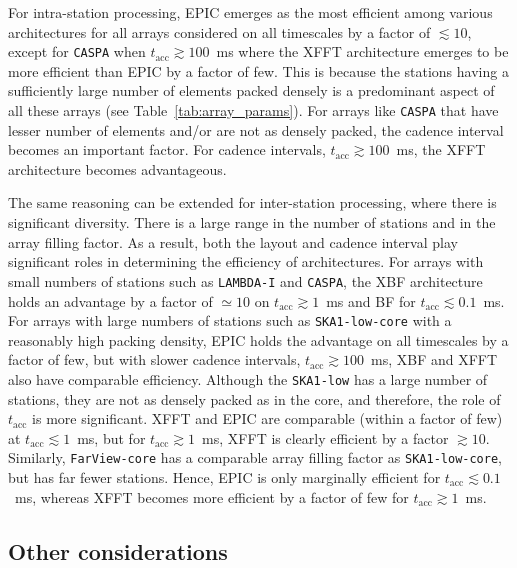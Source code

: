\documentclass[
  journal=pasa,
  manuscript=article-type,
  year=2020,
  volume=37,
]{cup-journal}
\begin{document}
For intra-station processing, EPIC emerges as the most efficient among various architectures for all arrays considered on all timescales by a factor of $\lesssim 10$, except for \texttt{CASPA} when $t_\textrm{acc}\gtrsim 100$~ms where the XFFT architecture emerges to be more efficient than EPIC by a factor of few. This is because the stations having a sufficiently large number of elements packed densely is a predominant aspect of all these arrays (see Table~\ref{tab:array_params}). For arrays like \texttt{CASPA} that have lesser number of elements and/or are not as densely packed, the cadence interval becomes an important factor. For cadence intervals, $t_\textrm{acc}\gtrsim 100$~ms, the XFFT architecture becomes advantageous.

The same reasoning can be extended for inter-station processing, where there is significant diversity. There is a large range in the number of stations and in the array filling factor. As a result, both the layout and cadence interval play significant roles in determining the efficiency of architectures. For arrays with small numbers of stations such as \texttt{LAMBDA-I} and \texttt{CASPA}, the XBF architecture holds an advantage by a factor of $\simeq 10$ on $t_\textrm{acc}\gtrsim 1$~ms and BF for $t_\textrm{acc}\lesssim 0.1$~ms. For arrays with large numbers of stations such as \texttt{SKA1-low-core} with a reasonably high packing density, EPIC holds the advantage on all timescales by a factor of few, but with slower cadence intervals, $t_\textrm{acc}\gtrsim 100$~ms, XBF and XFFT also have comparable efficiency. Although the \texttt{SKA1-low} has a large number of stations, they are not as densely packed as in the core, and therefore, the role of $t_\textrm{acc}$ is more significant. XFFT and EPIC are comparable (within a factor of few) at $t_\textrm{acc}\lesssim 1$~ms, but for $t_\textrm{acc}\gtrsim 1$~ms, XFFT is clearly efficient by a factor $\gtrsim 10$. Similarly, \texttt{FarView-core} has a comparable array filling factor as \texttt{SKA1-low-core}, but has far fewer stations. Hence, EPIC is only marginally efficient for $t_\textrm{acc}\lesssim 0.1$~ms, whereas XFFT becomes more efficient by a factor of few for $t_\textrm{acc}\gtrsim 1$~ms. 

\subsection{Other considerations}\label{sec:other-metrics}
\end{document}
